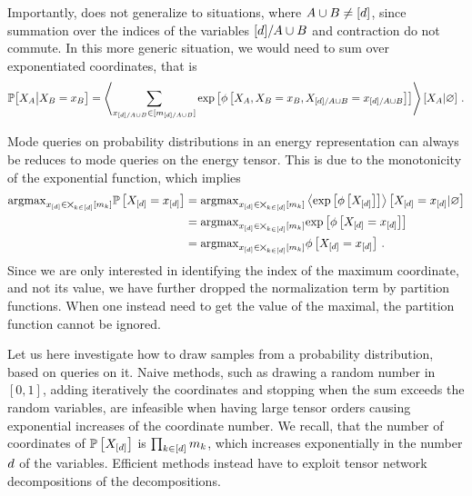 Importantly,  does not generalize to situations, where $A\cup B\neq[d]$, since summation over the indices of the variables $[d]/A\cup B$ and contraction do not commute.
In this more generic situation, we would need to sum over exponentiated coordinates, that is
\begin{align*}
    \mathbb{P}\big[X_{A}\big|X_{B}=x_{B}\big]
    = \left\langle 
        \sum_{x_{[d]/A\cup B}\in[m_{[d]/A\cup B}]}
        \mathrm{exp}\left[\phi\left[X_{A},X_{B}=x_{B},X_{[d]/A\cup B}=x_{[d]/A\cup B}\right]\right]
    \right\rangle \left[ X_{A} | \varnothing \right] \, .
\end{align*}


Mode queries on probability distributions in an energy representation can always be reduces to mode queries on the energy tensor.
This is due to the monotonicity of the exponential function, which implies
\begin{align*}
    \mathrm{argmax}_{x_{[d]}\in\bigtimes_{k\in[d]}[m_{k}]} \mathbb{P}\left[X_{[d]}=x_{[d]}\right]
    &=\mathrm{argmax}_{x_{[d]}\in\bigtimes_{k\in[d]}[m_{k}]} \left\langle \mathrm{exp}\left[\phi\left[X_{[d]}\right]\right]\right\rangle \left[ X_{[d]}=x_{[d]} | \varnothing \right] \\
    &=\mathrm{argmax}_{x_{[d]}\in\bigtimes_{k\in[d]}[m_{k}]} \mathrm{exp}\left[\phi\left[X_{[d]}=x_{[d]}\right]\right] \\
    &=\mathrm{argmax}_{x_{[d]}\in\bigtimes_{k\in[d]}[m_{k}]} \phi\left[X_{[d]}=x_{[d]}\right] \, .
\end{align*}
Since we are only interested in identifying the index of the maximum coordinate, and not its value, we have further dropped the normalization term by partition functions.
When one instead need to get the value of the maximal, the partition function cannot be ignored.


Let us here investigate how to draw samples from a probability distribution, based on queries on it.
Naive methods, such as drawing a random number in $[0,1]$, adding iteratively the coordinates and stopping when the sum exceeds the random variables, are infeasible when having large tensor orders causing exponential increases of the coordinate number.
We recall, that the number of coordinates of $\mathbb{P}\left[X_{[d]}\right]$ is $\prod_{k\in[d]}m_{k}$, which increases exponentially in the number $d$ of the variables.
Efficient methods instead have to exploit tensor network decompositions of the decompositions.

